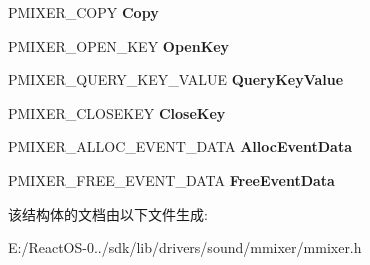 \begin{DoxyCompactItemize}
P\+M\+I\+X\+E\+R\+\_\+\+C\+O\+PY {\bfseries Copy}
\item 
\mbox{\label{struct_m_i_x_e_r___c_o_n_t_e_x_t_a132e54f15a24050547e3ed4e4f2d14ca}} 
P\+M\+I\+X\+E\+R\+\_\+\+O\+P\+E\+N\+\_\+\+K\+EY {\bfseries Open\+Key}
\item 
\mbox{\label{struct_m_i_x_e_r___c_o_n_t_e_x_t_a67be703c83eb33066742b97b69f6f178}} 
P\+M\+I\+X\+E\+R\+\_\+\+Q\+U\+E\+R\+Y\+\_\+\+K\+E\+Y\+\_\+\+V\+A\+L\+UE {\bfseries Query\+Key\+Value}
\item 
\mbox{\label{struct_m_i_x_e_r___c_o_n_t_e_x_t_a49a9cc279b860bb62cb578d93e4f5414}} 
P\+M\+I\+X\+E\+R\+\_\+\+C\+L\+O\+S\+E\+K\+EY {\bfseries Close\+Key}
\item 
\mbox{\label{struct_m_i_x_e_r___c_o_n_t_e_x_t_a106ac2acc4185a5bf2d499d8ce96105b}} 
P\+M\+I\+X\+E\+R\+\_\+\+A\+L\+L\+O\+C\+\_\+\+E\+V\+E\+N\+T\+\_\+\+D\+A\+TA {\bfseries Alloc\+Event\+Data}
\item 
\mbox{\label{struct_m_i_x_e_r___c_o_n_t_e_x_t_a744ed7330109a766e01e6c5267938dd4}} 
P\+M\+I\+X\+E\+R\+\_\+\+F\+R\+E\+E\+\_\+\+E\+V\+E\+N\+T\+\_\+\+D\+A\+TA {\bfseries Free\+Event\+Data}
\end{DoxyCompactItemize}


该结构体的文档由以下文件生成\+:\begin{DoxyCompactItemize}
\item 
E\+:/\+React\+O\+S-\/0../sdk/lib/drivers/sound/mmixer/mmixer.\+h\end{DoxyCompactItemize}
